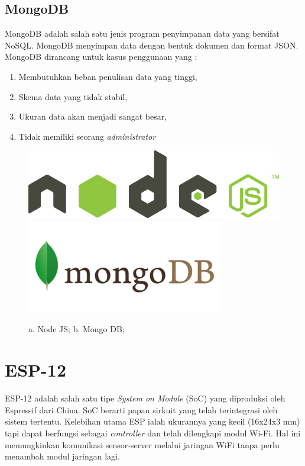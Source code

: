 \subsection{MongoDB}
MongoDB adalah salah satu jenis program penyimpanan data yang bersifat NoSQL. MongoDB menyimpan data dengan bentuk dokumen dan format JSON. MongoDB dirancang untuk kasus penggunaan yang \cite{why_mongo}:
\begin{enumerate}
	\item Membutuhkan beban penulisan data yang tinggi,
	\item Skema data yang tidak stabil,
	\item Ukuran data akan menjadi sangat besar,
	\item Tidak memiliki seorang \textit{administrator}
\end{enumerate}

\begin{figure}[H]
    \centering
	\includegraphics[scale=0.15]{images/nodejs.png}
    \includegraphics[scale=0.3]{images/mongodb.png}
    \caption{a. Node JS; b. Mongo DB;}
\end{figure}

\section{ESP-12}
ESP-12 adalah salah satu tipe \textit{System on Module} (SoC) yang diproduksi oleh Espressif dari China. SoC berarti papan sirkuit yang telah terintegrasi oleh sistem tertentu. Kelebihan utama ESP ialah ukurannya yang kecil (16x24x3 mm) tapi dapat berfungsi sebagai \textit{controller} dan telah dilengkapi modul Wi-Fi. Hal ini memungkinkan komunikasi sensor-server melalui jaringan WiFi tanpa perlu menambah modul jaringan lagi.


